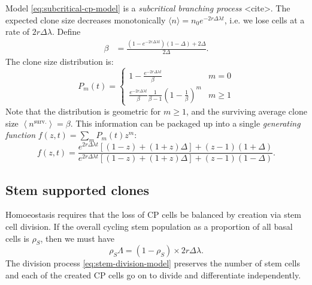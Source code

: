 \documentclass[10pt,UKenglish]{article}
\begin{document}
Model \ref{eq:subcritical-cp-model} is a \emph{subcritical branching process} <cite>. The expected clone size decreases monotonically $\langle n \rangle = n_0 e^{-2 r \Delta \lambda t}$, i.e. we lose cells at a rate of $2 r \Delta \lambda$. Define
\begin{align*}
\beta &= \frac{\left(1-e^{-2 r \Delta \lambda t}\right)(1-\Delta)+2\Delta}{2\Delta}.
\end{align*}
The clone size distribution is:
\begin{equation*}
P_m(t) = \begin{cases}
1 - \frac{e^{-2 r \Delta \lambda t}}{\beta} & m=0 \\
\frac{e^{-2 r \Delta \lambda t}}{\beta} \frac{1}{\beta-1} \left(1-\frac{1}{\beta}\right)^m & m\ge1
\end{cases}
\end{equation*}
Note that the distribution is geometric for $m \ge 1$, and the surviving average clone size $\left\langle n^\textrm{surv.} \right\rangle = \beta$. This information can be packaged up into a single \emph{generating function} $f(z,t) = \sum_m P_m(t) z^m$:
\begin{equation*}
f(z,t) = \frac{e^{2 r \Delta \lambda t}\left[(1-z) + (1+z)\Delta\right] + (z-1)(1+\Delta)}{e^{2 r \Delta \lambda t}\left[(1-z) + (1+z)\Delta\right] + (z-1)(1-\Delta)}.
\end{equation*}

\subsection{\label{sec:subcritical-immigration}Stem supported clones}

Homoeostasis requires that the loss of CP cells be balanced by creation via stem cell division. If the overall cycling stem population as a proportion of all basal cells is $\rho_S$, then we must have $$\rho_S \Lambda = (1-\rho_S) \times 2 r \Delta \lambda.$$ The division process \ref{eq:stem-division-model} preserves the number of stem cells and each of the created CP cells go on to divide and differentiate independently.
\end{document}
